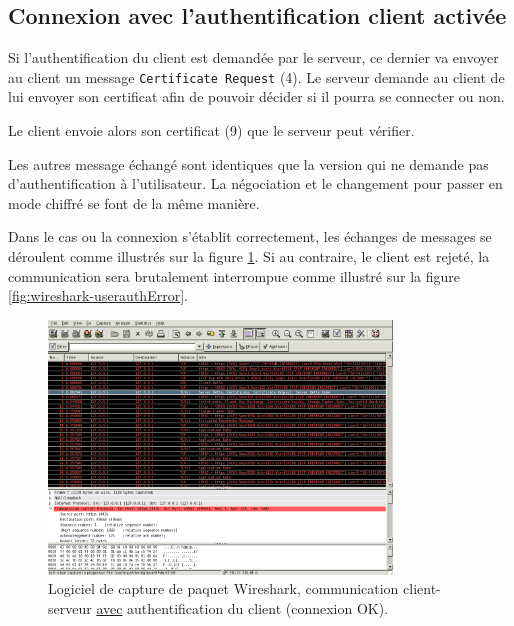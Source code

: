 \documentclass[10pt,a4paper,titlepage]{article}
\begin{document}
\subsection{Connexion avec l'authentification client activée}

Si l'authentification du client est demandée par le serveur, ce dernier va envoyer au client un message \texttt{Certificate Request} (4). Le serveur demande au client de lui envoyer son certificat afin de pouvoir décider si il pourra se connecter ou non.

Le client envoie alors son certificat (9) que le serveur peut vérifier. 

Les autres message échangé sont identiques que la version qui ne demande pas d'authentification à l'utilisateur. La négociation et le changement pour passer en mode chiffré se font de la même manière.

Dans le cas ou la connexion s'établit correctement, les échanges de messages se déroulent comme illustrés sur la figure \ref{fig:wireshark-userauthOk}. Si au contraire, le client est rejeté, la communication sera brutalement interrompue comme illustré sur la figure \ref{fig:wireshark-userauthError}.

\begin{figure}[htbp]
   \begin{center}
      \includegraphics[width=345px]{img/wireshark-with-auth-OK.png}
   \end{center}
   \caption{Logiciel de capture de paquet Wireshark, communication client-serveur \underline{avec} authentification du client (connexion OK).}
	\label{fig:wireshark-userauthOk}
\end{figure}
\end{document}
